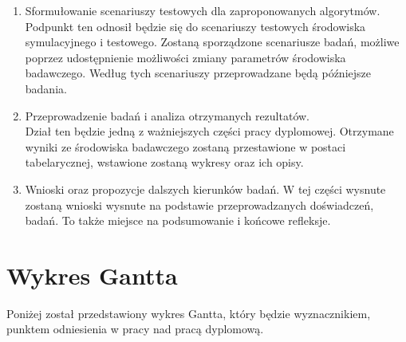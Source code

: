 \documentclass[12pt]{article} %
\begin{document}
\begin{enumerate}
\item Sformułowanie scenariuszy testowych dla zaproponowanych algorytmów.\\
Podpunkt ten odnosił będzie się do scenariuszy testowych środowiska symulacyjnego i testowego. Zostaną sporządzone scenariusze badań, możliwe poprzez udostępnienie możliwości zmiany parametrów środowiska badawczego. Według tych scenariuszy przeprowadzane będą późniejsze badania.

\item Przeprowadzenie badań i analiza otrzymanych rezultatów.\\
Dział ten będzie jedną z ważniejszych części pracy dyplomowej. Otrzymane wyniki ze środowiska badawczego zostaną przestawione w postaci tabelarycznej, wstawione zostaną wykresy oraz ich opisy.

\item Wnioski oraz propozycje dalszych kierunków badań.
W tej części wysnute zostaną wnioski wysnute na podstawie przeprowadzanych doświadczeń, badań. To także miejsce na podsumowanie i końcowe refleksje.
\end{enumerate}

\newpage
\section{Wykres Gantta}
Poniżej został przedstawiony wykres Gantta, który będzie wyznacznikiem, punktem odniesienia w pracy nad pracą dyplomową.
\end{document}
